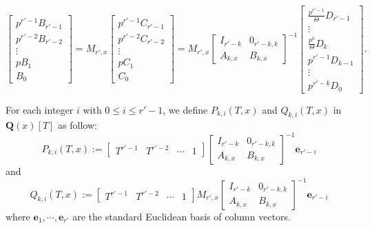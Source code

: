 \documentclass[11pt]{amsart}
\theoremstyle{definition}
\numberwithin{equation}{subsection}
\theoremstyle{plain}
\theoremstyle{plain}
\theoremstyle{plain}
\theoremstyle{plain}
\theoremstyle{plain}
\theoremstyle{plain}
\theoremstyle{plain}
\theoremstyle{plain}
\theoremstyle{plain}
\theoremstyle{plain}
\theoremstyle{plain}
\theoremstyle{plain}
\theoremstyle{definition}
\theoremstyle{definition}
\theoremstyle{definition}
\theoremstyle{remark}
\renewcommand{\(}{\textup{(}}
\renewcommand{\)}{\textup{)}}
\newcommand{\Q}{\mathbf{Q}}
\begin{document}
\begin{equation}\label{eq: D and B matrix}
        \begin{bmatrix}
        p^{r'-1}B_{r'-1}\\
        p^{r'-2}B_{r'-2}\\
        \vdots\\
        pB_1\\
        B_0
    \end{bmatrix}
    =
    M_{r',x}
    \begin{bmatrix}
        p^{r'-1}C_{r'-1}\\
        p^{r'-2}C_{r'-2}\\
        \vdots\\
        pC_1\\
        C_0
    \end{bmatrix}
    =
    M_{r',x}
    \begin{bmatrix}
        I_{r'-k} & 0_{r'-k,k}\\
        A_{k,x} & B_{k,x}
    \end{bmatrix}^{-1}
    \begin{bmatrix}
        \frac{p^{r'-1}}{\Theta}D_{r'-1}\\
        \vdots\\
        \frac{p^k}{\Theta}D_k\\
        p^{r'-1}D_{k-1}\\
        \vdots\\
        p^{r'-k}D_0
    \end{bmatrix}.
\end{equation}


For each integer $i$ with $0\leq i\leq r'-1$, we define $P_{k,i}(T,x)$ and $Q_{k,i}(T,x)$ in $\Q(x)[T]$ as follow:
\begin{equation*}
    P_{k,i}(T,x):=
    \begin{bmatrix}
        T^{r'-1} & T^{r'-2} & \cdots & 1
    \end{bmatrix}
    \begin{bmatrix}
        I_{r'-k} & 0_{r'-k,k}\\
        A_{k,x} & B_{k,x}
    \end{bmatrix}^{-1}
    \mathbf{e}_{r'-i}
\end{equation*}
and
\begin{equation*}
    Q_{k,i}(T,x):=
    \begin{bmatrix}
        T^{r'-1} & T^{r'-2} & \cdots & 1
    \end{bmatrix}
    M_{r',x}
    \begin{bmatrix}
        I_{r'-k} & 0_{r'-k,k}\\
        A_{k,x} & B_{k,x}
    \end{bmatrix}^{-1}
    \mathbf{e}_{r'-i}
\end{equation*}
where $\mathbf{e}_1,\cdots,\mathbf{e}_{r'}$ are the standard Euclidean basis of column vectors.
\end{document}

